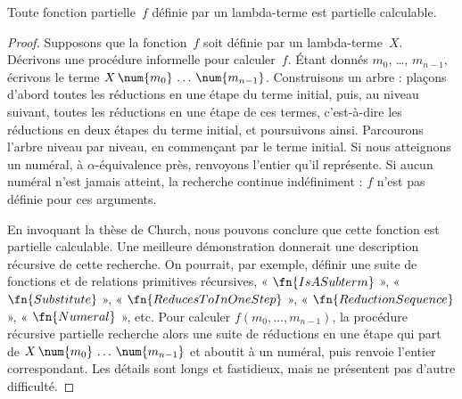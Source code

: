 \documentclass[../../../include/open-logic-section]{subfiles}
\begin{document}

\begin{thm}
Toute fonction partielle~$f$ définie par un lambda-terme
est partielle calculable.
\end{thm}

\begin{proof}
Supposons que la fonction~$f$ soit définie par un
lambda-terme~$X$. Décrivons une procédure informelle
pour calculer~$f$. Étant donnés $m_0$, \dots,
$m_{n-1}$, écrivons le terme
$X\,\num{m_0}\,\dots\,\num{m_{n-1}}$.
Construisons un arbre : plaçons d'abord toutes les
réductions en une étape du terme initial, puis, au
niveau suivant, toutes les réductions en une étape
de ces termes, c'est-à-dire les réductions en deux
étapes du terme initial, et poursuivons ainsi.
Parcourons l'arbre niveau par niveau, en commençant par le terme initial. Si nous atteignons
un numéral, à $\alpha$-équivalence près, renvoyons l'entier qu'il représente.
Si aucun numéral n'est jamais atteint, la recherche
continue indéfiniment : $f$ n'est pas définie pour
ces arguments.

En invoquant la thèse de Church, nous pouvons conclure
que cette fonction est partielle calculable. Une
meilleure démonstration donnerait une description
récursive de cette recherche. On pourrait, par exemple,
définir une suite de fonctions et de relations primitives
récursives, « $\fn{IsASubterm}$ »,
« $\fn{Substitute}$ »,
« $\fn{ReducesToInOneStep}$ »,
« $\fn{ReductionSequence}$ »,
« $\fn{Numeral}$ », etc. Pour calculer
$f(m_0, \dots, m_{n-1})$, la procédure récursive
partielle recherche alors une suite de réductions
en une étape qui part de
$X\,\num{m_0}\,\dots\,\num{m_{n-1}}$ et aboutit
à un numéral, puis renvoie l'entier correspondant.
Les détails sont longs et fastidieux, mais ne présentent
pas d'autre difficulté.
\end{proof}
\end{document}
